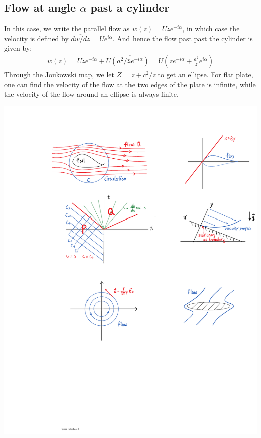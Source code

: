 \documentclass[11pt]{book}
\theoremstyle{break}
\theoremstyle{break}
\begin{document}
\subsection*{Flow at angle $\alpha$ past a cylinder}
In this case, we write the parallel flow as $w(z) = U ze^{-i\alpha}$, in which case the velocity is defined by $\overline{dw/dz} = Ue^{i\alpha}$. And hence the flow past past the cylinder is given by:
\begin{align*}
w(z) = Uze^{-i\alpha} + U \overline{\left( a^2/\bar{z} e^{-i\alpha}\right)} = U \left( ze^{-i\alpha} + \frac{a^2}{z}e^{i\alpha}\right)
\end{align*}
Through the Joukowski map, we let $Z = z+ c^2/z$ to get an ellipse. For flat plate, one can find the velocity of the flow at the two edges of the plate is infinite, while the velocity of the flow around an ellipse is always finite. 
\begin{center}
\includegraphics[scale=1.19]{ellipse.pdf}
\end{center}
\end{document}
